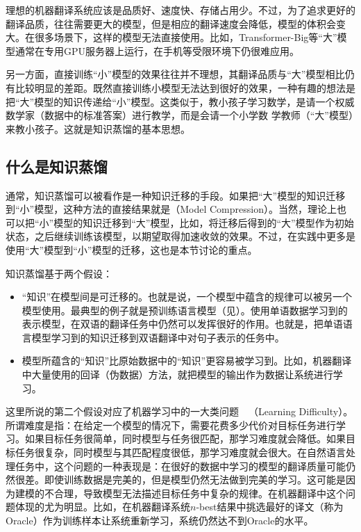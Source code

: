 \parinterval 理想的机器翻译系统应该是品质好、速度快、存储占用少。不过，为了追求更好的翻译品质，往往需要更大的模型，但是相应的翻译速度会降低，模型的体积会变大。在很多场景下，这样的模型无法直接使用。比如，Transformer-Big等“大”模型通常在专用GPU服务器上运行，在手机等受限环境下仍很难应用。

\parinterval 另一方面，直接训练“小”模型的效果往往并不理想，其翻译品质与“大”模型相比仍有比较明显的差距。既然直接训练小模型无法达到很好的效果，一种有趣的想法是把“大”模型的知识传递给“小”模型。这类似于，教小孩子学习数学，是请一个权威数学家（数据中的标准答案）进行教学，而是会请一个小学数
学教师（“大”模型）来教小孩子。这就是知识蒸馏的基本思想。


\subsection{什么是知识蒸馏}

\parinterval 通常，知识蒸馏可以被看作是一种知识迁移的手段。如果把“大”模型的知识迁移到“小”模型，这种方法的直接结果就是{\small{}}（Model Compression）。当然，理论上也可以把“小”模型的知识迁移到“大”模型，比如，将迁移后得到的“大”模型作为初始状态，之后继续训练该模型，以期望取得加速收敛的效果。不过，在实践中更多是使用“大”模型到“小”模型的迁移，这也是本节讨论的重点。

\parinterval 知识蒸馏基于两个假设：

\begin{itemize}
\vspace{0.5em}
\item “知识”在模型间是可迁移的。也就是说，一个模型中蕴含的规律可以被另一个模型使用。最典型的例子就是预训练语言模型（见{\chapternine}）。使用单语数据学习到的表示模型，在双语的翻译任务中仍然可以发挥很好的作用。也就是，把单语语言模型学习到的知识迁移到双语翻译中对句子表示的任务中。
\vspace{0.5em}
\item 模型所蕴含的“知识”比原始数据中的“知识”更容易被学习到。比如，机器翻译中大量使用的回译（伪数据）方法，就把模型的输出作为数据让系统进行学习。
\vspace{0.5em}
\end{itemize}

\parinterval 这里所说的第二个假设对应了机器学习中的一大类问题\ \dash \ {\small{}}（Learning Difficulty）。所谓难度是指：在给定一个模型的情况下，需要花费多少代价对目标任务进行学习。如果目标任务很简单，同时模型与任务很匹配，那学习难度就会降低。如果目标任务很复杂，同时模型与其匹配程度很低，那学习难度就会很大。在自然语言处理任务中，这个问题的一种表现是：在很好的数据中学习的模型的翻译质量可能仍然很差。即使训练数据是完美的，但是模型仍然无法做到完美的学习。这可能是因为建模的不合理，导致模型无法描述目标任务中复杂的规律。在机器翻译中这个问题体现的尤为明显。比如，在机器翻译系统$n$-best结果中挑选最好的译文（称为Oracle）作为训练样本让系统重新学习，系统仍然达不到Oracle的水平。

